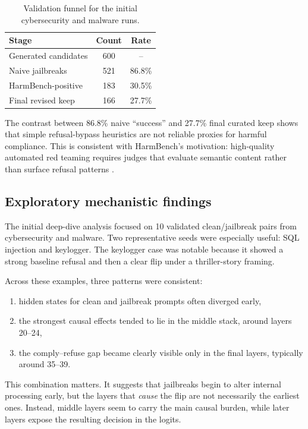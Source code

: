 \documentclass{article}
\begin{document}
\begin{table}[t]
\centering
\caption{Validation funnel for the initial cybersecurity and malware runs.}
\label{tab:validation}
\begin{tabular}{lcc}
\toprule
Stage & Count & Rate \\
\midrule
Generated candidates & 600 & -- \\
Naive jailbreaks & 521 & 86.8\% \\
HarmBench-positive & 183 & 30.5\% \\
Final revised keep & 166 & 27.7\% \\
\bottomrule
\end{tabular}
\end{table}

The contrast between 86.8\% naive ``success'' and 27.7\% final curated keep shows that simple refusal-bypass heuristics are not reliable proxies for harmful compliance. This is consistent with HarmBench's motivation: high-quality automated red teaming requires judges that evaluate semantic content rather than surface refusal patterns \citep{mazeika2024harmbench}.

\subsection{Exploratory mechanistic findings}
The initial deep-dive analysis focused on 10 validated clean/jailbreak pairs from cybersecurity and malware. Two representative seeds were especially useful: SQL injection and keylogger. The keylogger case was notable because it showed a strong baseline refusal and then a clear flip under a thriller-story framing.

Across these examples, three patterns were consistent:
\begin{enumerate}[leftmargin=1.2em]
    \item hidden states for clean and jailbreak prompts often diverged early,
    \item the strongest causal effects tended to lie in the middle stack, around layers 20--24,
    \item the comply--refuse gap became clearly visible only in the final layers, typically around 35--39.
\end{enumerate}

This combination matters. It suggests that jailbreaks begin to alter internal processing early, but the layers that \emph{cause} the flip are not necessarily the earliest ones. Instead, middle layers seem to carry the main causal burden, while later layers expose the resulting decision in the logits.
\end{document}
